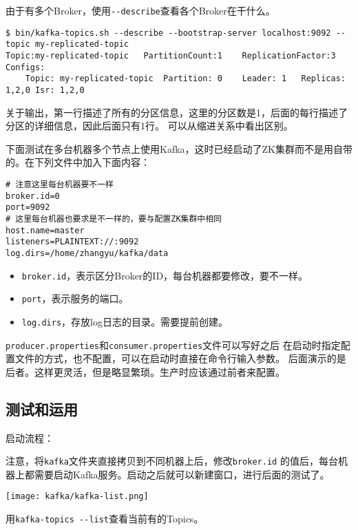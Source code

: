 由于有多个Broker，使用\lstinline{--describe}查看各个Broker在干什么。

\begin{lstlisting}[style=mysh]
$ bin/kafka-topics.sh --describe --bootstrap-server localhost:9092 --topic my-replicated-topic
Topic:my-replicated-topic   PartitionCount:1    ReplicationFactor:3 Configs:
	Topic: my-replicated-topic  Partition: 0    Leader: 1   Replicas: 1,2,0 Isr: 1,2,0
\end{lstlisting}

关于输出，第一行描述了所有的分区信息，这里的分区数是1，后面的每行描述了分区的详细信息，因此后面只有1行。
可以从缩进关系中看出区别。

下面测试在多台机器多个节点上使用Kafka，这时已经启动了ZK集群而不是用自带的。在下列文件中加入下面内容：

\begin{lstlisting}[style=mysh,title=server.properties]
# 注意这里每台机器要不一样
broker.id=0
port=9092
# 这里每台机器也要求是不一样的，要与配置ZK集群中相同
host.name=master
listeners=PLAINTEXT://:9092
log.dirs=/home/zhangyu/kafka/data
\end{lstlisting}

\begin{itemize}
    \item \lstinline{broker.id}，表示区分Broker的ID，每台机器都要修改，要不一样。
    \item \lstinline{port}，表示服务的端口。
    \item \lstinline{log.dirs}，存放log日志的目录。需要提前创建。
\end{itemize}

\lstinline{producer.properties}和\lstinline{consumer.properties}文件可以写好之后
在启动时指定配置文件的方式，也不配置，可以在启动时直接在命令行输入参数。
后面演示的是后者。这样更灵活，但是略显繁琐。生产时应该通过前者来配置。

\subsection{测试和运用}

启动流程：



注意，将\lstinline{kafka}文件夹直接拷贝到不同机器上后，修改\lstinline{broker.id}
的值后，每台机器上都需要启动Kafka服务。启动之后就可以新建窗口，进行后面的测试了。

\begin{center}
    \texttt{[image: kafka/kafka-list.png]}

    用\lstinline{kafka-topics --list}查看当前有的Topics。
\end{center}

